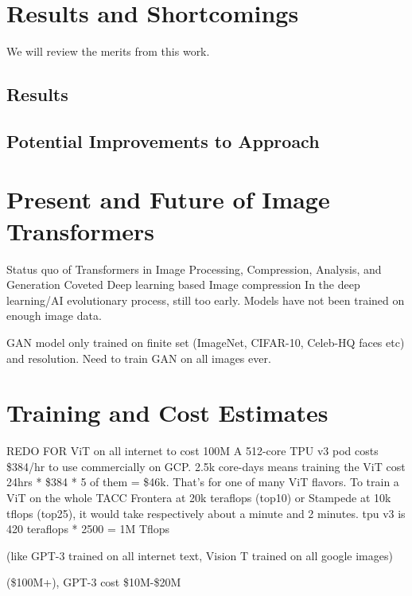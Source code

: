 \section{Results and Shortcomings}
We will review the merits from this work.

\subsection{Results}

\subsection{Potential Improvements to Approach}

\newpage
\section{Present and Future of Image Transformers}
Status quo of Transformers in Image Processing, Compression, Analysis, and Generation
Coveted Deep learning based Image compression 
In the deep learning/AI evolutionary process, still too early. Models have not been trained on enough image data.

GAN model only trained on finite set (ImageNet, CIFAR-10, Celeb-HQ faces etc) and resolution.
Need to train GAN on all images ever.


\section{Training and Cost Estimates}

REDO FOR ViT on all internet to cost 100M
A 512-core TPU v3 pod costs \$384/hr to use commercially on GCP. 
2.5k core-days means training the ViT cost 24hrs * \$384 * 5 of them = \$46k. 
That's for one of many ViT flavors.
To train a ViT on the whole TACC Frontera at 20k teraflops (top10) or 
Stampede at 10k tflops (top25), it would take respectively about a minute and 2 minutes.
tpu v3 is 420 teraflops * 2500 = 1M Tflops

(like GPT-3 trained on all internet text, Vision T trained on all google images)

(\$100M+), GPT-3 cost \$10M-\$20M